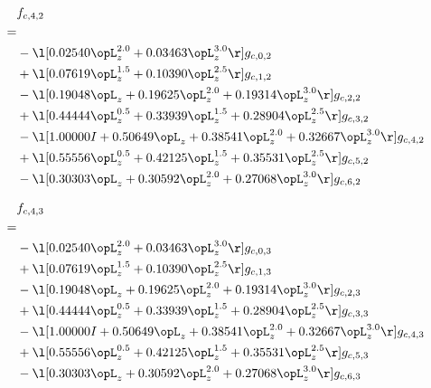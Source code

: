 \begin{alignat}{2} 
\label{eq:f_42_0} 
& f_{c,4,2} \nonumber \\ 
 = \\ 
& - \l[  0.02540 \opL_z^{2.0} +  0.03463 \opL_z^{3.0}  \r] g_{c,0,2} \nonumber \\ 
& + \l[  0.07619 \opL_z^{1.5} +  0.10390 \opL_z^{2.5}  \r] g_{c,1,2} \nonumber \\ 
& - \l[  0.19048 \opL_z +  0.19625 \opL_z^{2.0} +  0.19314 \opL_z^{3.0}  \r] g_{c,2,2} \nonumber \\ 
& + \l[  0.44444 \opL_z^{0.5} +  0.33939 \opL_z^{1.5} +  0.28904 \opL_z^{2.5}  \r] g_{c,3,2} \nonumber \\ 
& - \l[  1.00000 I +  0.50649 \opL_z +  0.38541 \opL_z^{2.0} +  0.32667 \opL_z^{3.0}  \r] g_{c,4,2} \nonumber \\ 
& + \l[  0.55556 \opL_z^{0.5} +  0.42125 \opL_z^{1.5} +  0.35531 \opL_z^{2.5}  \r] g_{c,5,2} \nonumber \\ 
& - \l[  0.30303 \opL_z +  0.30592 \opL_z^{2.0} +  0.27068 \opL_z^{3.0}  \r] g_{c,6,2} \nonumber \\ 
\end{alignat} 


\begin{alignat}{2} 
\label{eq:f_43_0} 
& f_{c,4,3} \nonumber \\ 
 = \\ 
& - \l[  0.02540 \opL_z^{2.0} +  0.03463 \opL_z^{3.0}  \r] g_{c,0,3} \nonumber \\ 
& + \l[  0.07619 \opL_z^{1.5} +  0.10390 \opL_z^{2.5}  \r] g_{c,1,3} \nonumber \\ 
& - \l[  0.19048 \opL_z +  0.19625 \opL_z^{2.0} +  0.19314 \opL_z^{3.0}  \r] g_{c,2,3} \nonumber \\ 
& + \l[  0.44444 \opL_z^{0.5} +  0.33939 \opL_z^{1.5} +  0.28904 \opL_z^{2.5}  \r] g_{c,3,3} \nonumber \\ 
& - \l[  1.00000 I +  0.50649 \opL_z +  0.38541 \opL_z^{2.0} +  0.32667 \opL_z^{3.0}  \r] g_{c,4,3} \nonumber \\ 
& + \l[  0.55556 \opL_z^{0.5} +  0.42125 \opL_z^{1.5} +  0.35531 \opL_z^{2.5}  \r] g_{c,5,3} \nonumber \\ 
& - \l[  0.30303 \opL_z +  0.30592 \opL_z^{2.0} +  0.27068 \opL_z^{3.0}  \r] g_{c,6,3} \nonumber \\ 
\end{alignat} 


